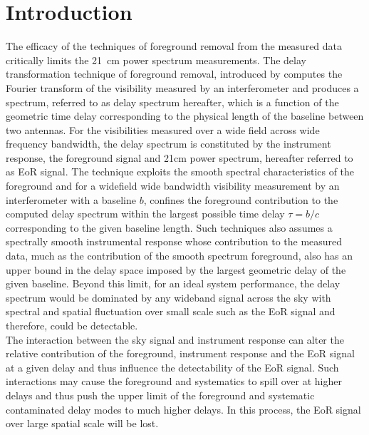 \documentclass[12pt,preprint]{aastex}
\begin{document}
\section{Introduction}
The efficacy of the techniques of foreground removal from the measured data critically limits the 21~cm power spectrum measurements. The delay transformation technique of foreground removal, introduced by  \citep{ParsonsBacker2009,Parsons2012} computes the Fourier transform of the visibility measured by an interferometer and produces a spectrum, referred to as delay spectrum hereafter, which is a function of the geometric time delay corresponding to the physical length of the baseline between two antennas. For the visibilities measured over a wide field across wide frequency bandwidth, the delay spectrum is constituted by the instrument response, the foreground signal and 21cm power spectrum, hereafter referred to as EoR signal.
The technique exploits the smooth spectral characteristics of the foreground and for a widefield wide bandwidth visibility measurement by an interferometer with a baseline $b$, confines the foreground contribution to the computed delay spectrum within the largest possible time delay $\tau = b/c$ corresponding to the given baseline length. Such techniques also assumes a spectrally smooth instrumental response whose contribution to the measured data, much as the contribution of the smooth spectrum foreground, also has an upper bound in the delay space imposed by the largest geometric delay of the given baseline. 
Beyond this limit, for an ideal system performance, the delay spectrum would be dominated by any wideband signal across the sky with spectral and spatial fluctuation over small scale such as the EoR signal and therefore, could be detectable.\\ 
The interaction between the sky signal and instrument response can alter the relative contribution of the foreground, instrument response and the EoR signal at a given delay and thus influence the detectability of the EoR signal. Such interactions may cause the foreground and systematics to spill over at higher delays and thus push the upper limit of the foreground and systematic contaminated delay modes to much higher delays. In this process, the EoR signal over large spatial scale will be lost.
\end{document}
